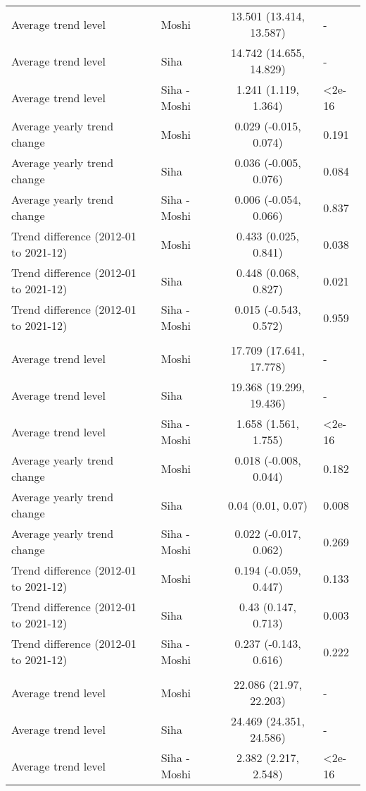 \begin{longtable}{l|lcl}
\midrule\addlinespace[2.5pt]
Average trend level & Moshi & 13.501 (13.414, 13.587) & - \\ 
Average trend level & Siha & 14.742 (14.655, 14.829) & - \\ 
Average trend level & Siha - Moshi & 1.241 (1.119, 1.364) & <2e-16 \\ 
Average yearly trend change & Moshi & 0.029 (-0.015, 0.074) & 0.191 \\ 
Average yearly trend change & Siha & 0.036 (-0.005, 0.076) & 0.084 \\ 
Average yearly trend change & Siha - Moshi & 0.006 (-0.054, 0.066) & 0.837 \\ 
Trend difference (2012-01 to 2021-12) & Moshi & 0.433 (0.025, 0.841) & 0.038 \\ 
Trend difference (2012-01 to 2021-12) & Siha & 0.448 (0.068, 0.827) & 0.021 \\ 
Trend difference (2012-01 to 2021-12) & Siha - Moshi & 0.015 (-0.543, 0.572) & 0.959 \\ 
\midrule\addlinespace[2.5pt]
\multicolumn{4}{l}{Mean temp. (ºC)} \\ 
\midrule\addlinespace[2.5pt]
Average trend level & Moshi & 17.709 (17.641, 17.778) & - \\ 
Average trend level & Siha & 19.368 (19.299, 19.436) & - \\ 
Average trend level & Siha - Moshi & 1.658 (1.561, 1.755) & <2e-16 \\ 
Average yearly trend change & Moshi & 0.018 (-0.008, 0.044) & 0.182 \\ 
Average yearly trend change & Siha & 0.04 (0.01, 0.07) & 0.008 \\ 
Average yearly trend change & Siha - Moshi & 0.022 (-0.017, 0.062) & 0.269 \\ 
Trend difference (2012-01 to 2021-12) & Moshi & 0.194 (-0.059, 0.447) & 0.133 \\ 
Trend difference (2012-01 to 2021-12) & Siha & 0.43 (0.147, 0.713) & 0.003 \\ 
Trend difference (2012-01 to 2021-12) & Siha - Moshi & 0.237 (-0.143, 0.616) & 0.222 \\ 
\midrule\addlinespace[2.5pt]
\multicolumn{4}{l}{Max. temp. (ºC)} \\ 
\midrule\addlinespace[2.5pt]
Average trend level & Moshi & 22.086 (21.97, 22.203) & - \\ 
Average trend level & Siha & 24.469 (24.351, 24.586) & - \\ 
Average trend level & Siha - Moshi & 2.382 (2.217, 2.548) & <2e-16 \\ 

\end{longtable}
